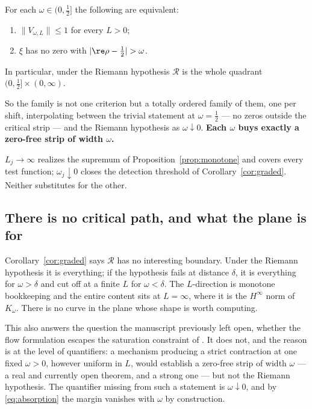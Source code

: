 \begin{corollary}\label{cor:graded}
For each $\omega\in(0,\frac12]$ the following are equivalent:
\begin{enumerate}
\item $\lVert V_{\omega,L}\rVert\leq1$ for every $L>0$;
\item $\xi$ has no zero with $|\re\rho-\frac12|>\omega$.
\end{enumerate}
In particular, under the Riemann hypothesis $\mathcal R$ is the whole quadrant
$(0,\frac12]\times(0,\infty)$.
\end{corollary}

So the family is not one criterion but a totally ordered family of them, one per
shift, interpolating between the trivial statement at $\omega=\frac12$ --- no
zeros outside the critical strip --- and the Riemann hypothesis as
$\omega\downarrow0$. \textbf{Each $\omega$ buys exactly a zero-free strip of width
$\omega$.}

\begin{remark}
$L_j\to\infty$ realizes the supremum of Proposition~\ref{prop:monotone} and
covers every test function; $\omega_j\downarrow0$ closes the detection threshold
of Corollary~\ref{cor:graded}. Neither substitutes for the other.
\end{remark}

\subsection{There is no critical path, and what the plane is for}

Corollary~\ref{cor:graded} says $\mathcal R$ has no interesting boundary. Under
the Riemann hypothesis it is everything; if the hypothesis fails at distance
$\delta$, it is everything for $\omega>\delta$ and cut off at a finite $L$ for
$\omega<\delta$. The $L$-direction is monotone bookkeeping and the entire content
sits at $L=\infty$, where it is the $H^\infty$ norm of $K_\omega$. There is no
curve in the plane whose shape is worth computing.

This also answers the question the manuscript previously left open, whether the
flow formulation escapes the saturation constraint of \cite{Selection}. It does
not, and the reason is at the level of quantifiers: a mechanism producing a
strict contraction at one fixed $\omega>0$, however uniform in $L$, would
establish a zero-free strip of width $\omega$ --- a real and currently open
theorem, and a strong one --- but not the Riemann hypothesis. The quantifier
missing from such a statement is $\omega\downarrow0$, and by
\eqref{eq:absorption} the margin vanishes with $\omega$ by construction.

